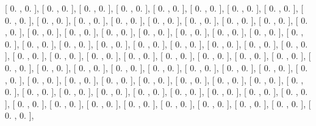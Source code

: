 \documentclass{article}
\begin{document}
       [ 0.        ,  0.        ],
       [ 0.        ,  0.        ],
       [ 0.        ,  0.        ],
       [ 0.        ,  0.        ],
       [ 0.        ,  0.        ],
       [ 0.        ,  0.        ],
       [ 0.        ,  0.        ],
       [ 0.        ,  0.        ],
       [ 0.        ,  0.        ],
       [ 0.        ,  0.        ],
       [ 0.        ,  0.        ],
       [ 0.        ,  0.        ],
       [ 0.        ,  0.        ],
       [ 0.        ,  0.        ],
       [ 0.        ,  0.        ],
       [ 0.        ,  0.        ],
       [ 0.        ,  0.        ],
       [ 0.        ,  0.        ],
       [ 0.        ,  0.        ],
       [ 0.        ,  0.        ],
       [ 0.        ,  0.        ],
       [ 0.        ,  0.        ],
       [ 0.        ,  0.        ],
       [ 0.        ,  0.        ],
       [ 0.        ,  0.        ],
       [ 0.        ,  0.        ],
       [ 0.        ,  0.        ],
       [ 0.        ,  0.        ],
       [ 0.        ,  0.        ],
       [ 0.        ,  0.        ],
       [ 0.        ,  0.        ],
       [ 0.        ,  0.        ],
       [ 0.        ,  0.        ],
       [ 0.        ,  0.        ],
       [ 0.        ,  0.        ],
       [ 0.        ,  0.        ],
       [ 0.        ,  0.        ],
       [ 0.        ,  0.        ],
       [ 0.        ,  0.        ],
       [ 0.        ,  0.        ],
       [ 0.        ,  0.        ],
       [ 0.        ,  0.        ],
       [ 0.        ,  0.        ],
       [ 0.        ,  0.        ],
       [ 0.        ,  0.        ],
       [ 0.        ,  0.        ],
       [ 0.        ,  0.        ],
       [ 0.        ,  0.        ],
       [ 0.        ,  0.        ],
       [ 0.        ,  0.        ],
       [ 0.        ,  0.        ],
       [ 0.        ,  0.        ],
       [ 0.        ,  0.        ],
       [ 0.        ,  0.        ],
       [ 0.        ,  0.        ],
       [ 0.        ,  0.        ],
       [ 0.        ,  0.        ],
       [ 0.        ,  0.        ],
       [ 0.        ,  0.        ],
       [ 0.        ,  0.        ],
       [ 0.        ,  0.        ],
       [ 0.        ,  0.        ],
       [ 0.        ,  0.        ],
       [ 0.        ,  0.        ],
       [ 0.        ,  0.        ],
       [ 0.        ,  0.        ],
       [ 0.        ,  0.        ],
       [ 0.        ,  0.        ],
       [ 0.        ,  0.        ],
       [ 0.        ,  0.        ],
       [ 0.        ,  0.        ],
       [ 0.        ,  0.        ],
       [ 0.        ,  0.        ],
       [ 0.        ,  0.        ],
       [ 0.        ,  0.        ],
\end{document}
